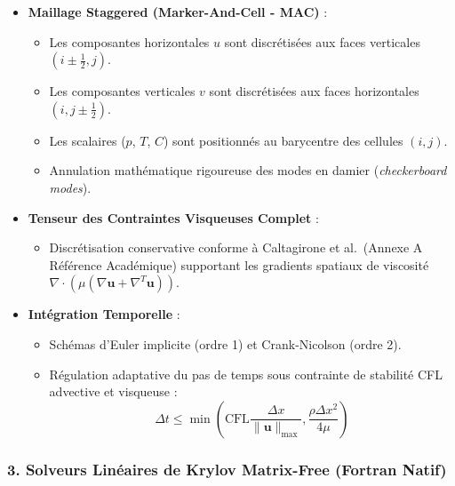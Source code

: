 \documentclass[
  french,
]{article}
\providecommand{\tightlist}{%
  \setlength{\itemsep}{0pt}\setlength{\parskip}{0pt}}
\begin{document}
\begin{itemize}
\tightlist
\item
  \textbf{Maillage Staggered (Marker-And-Cell - MAC)} :

  \begin{itemize}
  \tightlist
  \item
    Les composantes horizontales \(u\) sont discrétisées aux faces
    verticales \((i \pm \frac{1}{2}, j)\).
  \item
    Les composantes verticales \(v\) sont discrétisées aux faces
    horizontales \((i, j \pm \frac{1}{2})\).
  \item
    Les scalaires (\(p\), \(T\), \(C\)) sont positionnés au barycentre
    des cellules \((i, j)\).
  \item
    Annulation mathématique rigoureuse des modes en damier
    (\emph{checkerboard modes}).
  \end{itemize}
\item
  \textbf{Tenseur des Contraintes Visqueuses Complet} :

  \begin{itemize}
  \tightlist
  \item
    Discrétisation conservative conforme à Caltagirone et al.~(Annexe A
    Référence Académique) supportant les gradients spatiaux de viscosité
    \(\nabla \cdot (\mu (\nabla \mathbf{u} + \nabla^T \mathbf{u}))\).
  \end{itemize}
\item
  \textbf{Intégration Temporelle} :

  \begin{itemize}
  \tightlist
  \item
    Schémas d'Euler implicite (ordre 1) et Crank-Nicolson (ordre 2).
  \item
    Régulation adaptative du pas de temps sous contrainte de stabilité
    CFL advective et visqueuse :
    \[\Delta t \le \min\left( \text{CFL} \frac{\Delta x}{\|\mathbf{u}\|_{\max}}, \frac{\rho \Delta x^2}{4 \mu} \right)\]
  \end{itemize}
\end{itemize}

\subsubsection{3. Solveurs Linéaires de Krylov Matrix-Free (Fortran
Natif)}\label{solveurs-linuxe9aires-de-krylov-matrix-free-fortran-natif}
\end{document}
